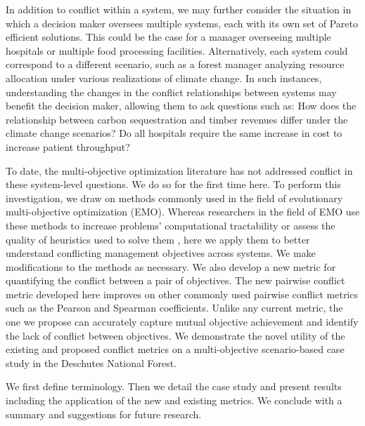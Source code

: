 In addition to conflict within a system, we may further consider the situation in which a decision maker oversees multiple systems, each with its own set of Pareto efficient solutions. This could be the case for a manager overseeing multiple hospitals or multiple food processing facilities. Alternatively, each system could correspond to a different scenario, such as a forest manager analyzing resource allocation under various realizations of climate change. In such instances, understanding the changes in the conflict relationships between systems may benefit the decision maker, allowing them to ask questions such as: How does the relationship between carbon sequestration and timber revenues differ under the climate change scenarios? Do all hospitals require the same increase in cost to increase patient throughput?

To date, the multi-objective optimization literature has not addressed conflict in these system-level questions. We do so for the first time here. To perform this investigation, we draw on methods commonly used in the field of evolutionary multi-objective optimization (EMO). Whereas researchers in the field of EMO use these methods to increase problems' computational tractability \cite{brockhoff2006all} or assess the quality of heuristics used to solve them \cite{zitzler2003performance}, here we apply them to better understand conflicting management objectives across systems. We make modifications to the methods as necessary. We also develop a new metric for quantifying the conflict between a pair of objectives. The new pairwise conflict metric developed here improves on other commonly used pairwise conflict metrics such as the Pearson and Spearman coefficients. Unlike any current metric, the one we propose can accurately capture mutual objective achievement and identify the lack of conflict between objectives. We demonstrate the novel utility of the existing and proposed conflict metrics on a multi-objective scenario-based case study in the Deschutes National Forest.

We first define terminology. Then we detail the case study and present results including the application of the new and existing metrics. We conclude with a summary and suggestions for future research.